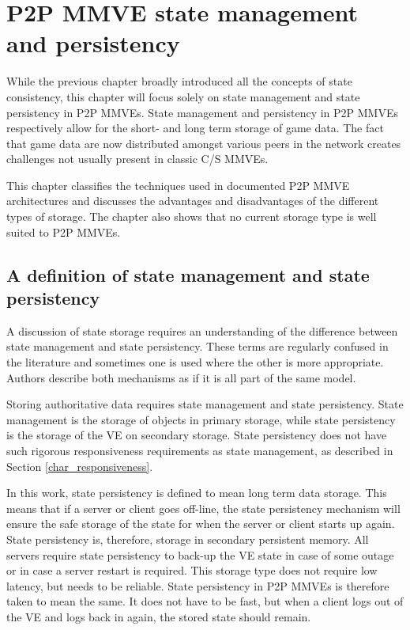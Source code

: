 \chapter{P2P MMVE state management and persistency}
\label{p2p_MMVE_state_persistency}

While the previous chapter broadly introduced all the concepts of state consistency, this chapter will focus solely on state management and state persistency in P2P MMVEs. State management and persistency in P2P MMVEs respectively allow for the short- and long term storage of game data. The fact that game data are now distributed amongst various peers in the network creates challenges not usually present in classic C/S MMVEs.

This chapter classifies the techniques used in documented P2P MMVE architectures and discusses the advantages and disadvantages of the different types of storage. The chapter also shows that no current storage type is well suited to P2P MMVEs.

\section{A definition of state management and state persistency}

A discussion of state storage requires an understanding of the difference between state management and state persistency. These terms are regularly confused in the literature and sometimes one is used where the other is more appropriate. Authors describe both mechanisms as if it is all part of the same model.

Storing authoritative data requires state management and state persistency. State management is the storage of objects in primary storage, while state persistency is the storage of the VE on secondary storage. State persistency does not have such rigorous responsiveness requirements as state management, as described in Section \ref{char_responsiveness}.

In this work, state persistency is defined to mean long term data storage. This means that if a server or client goes off-line, the state persistency mechanism will ensure the safe storage of the state for when the server or client starts up again. State persistency is, therefore, storage in secondary persistent memory. All servers require state persistency to back-up the VE state in case of some outage or in case a server restart is required. This storage type does not require low latency, but needs to be reliable. State persistency in P2P MMVEs is therefore taken to mean the same. It does not have to be fast, but when a client logs out of the VE and logs back in again, the stored state should remain.

